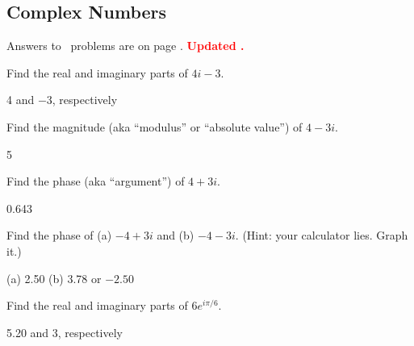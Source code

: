 \subsection{Complex Numbers} 


Answers to \thesubsection ~problems are on page \pageref{complex_numbers_answers}.  \textbf{\textcolor{red}{Updated \DTMnow.}}

\begin{Exercise}
Find the real and imaginary parts of $4i - 3$.
\end{Exercise}
\begin{Answer}
4 and $-3$, respectively
\end{Answer}

\begin{Exercise}
Find the magnitude (aka ``modulus'' or ``absolute value'') of $4-3i$.
\end{Exercise}
\begin{Answer}
5
\end{Answer}

\begin{Exercise}
Find the phase (aka ``argument'') of $4+3i$.
\end{Exercise}
\begin{Answer}
0.643
\end{Answer}

\begin{Exercise}
Find the phase of (a) $-4+3i$ and (b) $-4-3i$.  (Hint: your calculator lies.  Graph it.)
\end{Exercise}
\begin{Answer}
(a) 2.50 (b) 3.78 or $-2.50$
\end{Answer}

\begin{Exercise}
Find the real and imaginary parts of $6e^{i \pi/6}$.
\end{Exercise}
\begin{Answer}
5.20 and 3, respectively
\end{Answer}

